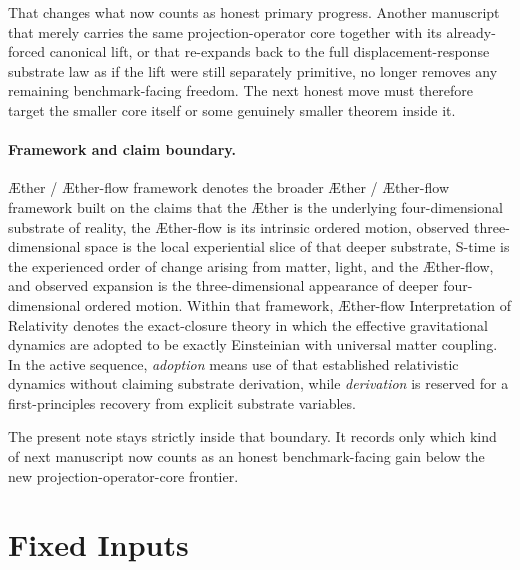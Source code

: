\documentclass[11pt]{article}
\newcommand{\Aether}{\AE{}ther}
\newcommand{\Aflow}{\AE{}ther-flow}
\newcommand{\TheoryName}{\Aflow{} Interpretation of Relativity}
\newcommand{\TheoryProgram}{\Aether{} / \Aflow{} framework}
\begin{document}
That changes what now counts as honest primary progress. Another manuscript that merely carries the same projection-operator core together with its already-forced canonical lift, or that re-expands back to the full displacement-response substrate law as if the lift were still separately primitive, no longer removes any remaining benchmark-facing freedom. The next honest move must therefore target the smaller core itself or some genuinely smaller theorem inside it.

\paragraph{Framework and claim boundary.}
\TheoryProgram{} denotes the broader \Aether{} / \Aflow{} framework built on the claims that the \Aether{} is the underlying four-dimensional substrate of reality, the \Aflow{} is its intrinsic ordered motion, observed three-dimensional space is the local experiential slice of that deeper substrate, S-time is the experienced order of change arising from matter, light, and the \Aflow{}, and observed expansion is the three-dimensional appearance of deeper four-dimensional ordered motion. Within that framework, \TheoryName{} denotes the exact-closure theory in which the effective gravitational dynamics are adopted to be exactly Einsteinian with universal matter coupling. In the active sequence, \emph{adoption} means use of that established relativistic dynamics without claiming substrate derivation, while \emph{derivation} is reserved for a first-principles recovery from explicit substrate variables.

The present note stays strictly inside that boundary. It records only which kind of next manuscript now counts as an honest benchmark-facing gain below the new projection-operator-core frontier.

\section{Fixed Inputs}
\end{document}
